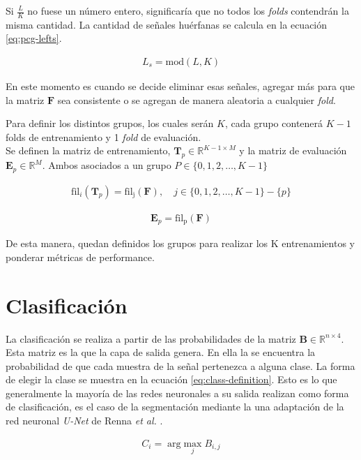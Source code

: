 \indent Si $\frac{L}{K}$ no fuese un número entero, significaría que no todos los \textit{folds} contendrán la misma
cantidad. La cantidad de señales huérfanas se calcula en la ecuación \ref{eq:pcg-lefts}.

\begin{align} \label{eq:pcg-lefts}
  L_{s} = \mathrm{mod}(L,K)
\end{align}

\indent En este momento es cuando se decide eliminar esas señales, agregar más para que la matriz $\mathbf{F}$ sea
consistente o se agregan de manera aleatoria a cualquier \textit{fold}.

Para definir los distintos grupos, los cuales serán $K$, cada grupo contenerá $K-1$ folds de entrenamiento y 1
\textit{fold} de evaluación. \\
\indent Se definen la matriz de entrenamiento, $\bm{T}_p \in \mathbb{R}^{K-1 \times M}$ y la matriz de evaluación
$\mathbf{E}_p \in \mathbb{R}^M$. Ambos asociados a un grupo $P \in \{0,1,2,\dots,K-1\}$

\begin{align}
  \mathrm{fil}_i(\bm{T}_p) = \mathrm{fil_j(\bm{F})}, \quad j \in \{0,1,2,\dots,K-1\}-\{p\}
\end{align}

\begin{align}
  \bm{E}_{p} = \mathrm{fil_p}(\bm{F})
\end{align}

\indent De esta manera, quedan definidos los grupos para realizar los K entrenamientos y ponderar métricas de
performance.

\section{Clasificación}

\indent La clasificación se realiza a partir de las probabilidades de la matriz $\bm{B} \in \mathbb{R}^{n \times 4}$.
Esta matriz es la que la capa de salida genera. En ella la se encuentra la probabilidad de que cada muestra de la
señal pertenezca a alguna clase. La forma de elegir la clase se muestra en la ecuación \ref{eq:class-definition}.
Esto es lo que generalmente la mayoría de las redes neuronales a su salida realizan como forma de clasificación, es
el caso de la segmentación mediante la una adaptación de la red neuronal \textit{U-Net} de Renna \textit{et al.}
\cite{pp:renna2018}.

\begin{align} \label{eq:class-definition}
C_i = \arg \underset{j}{\mathrm{max}} \; B_{i,j}
\end{align}


